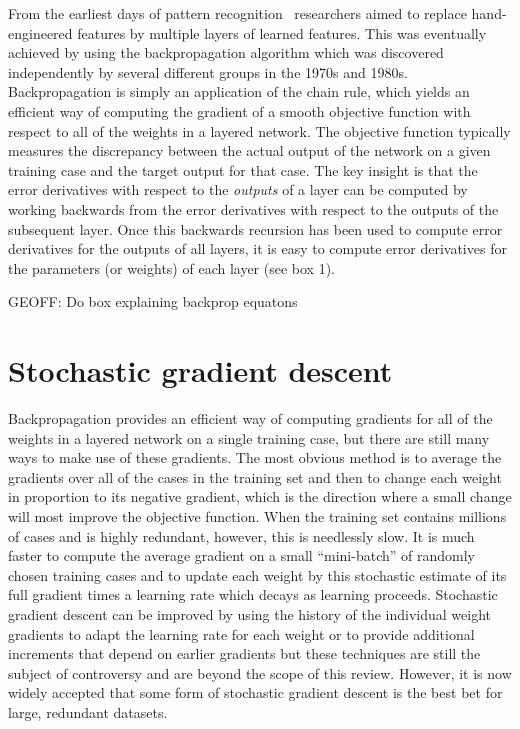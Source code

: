 \documentclass[]{article}
\begin{document}
From the earliest days of pattern recognition~\cite{selfridge, rosenblatt}
researchers aimed to replace hand-engineered features by multiple layers of
learned features.  This was eventually achieved by using the
backpropagation algorithm which was discovered independently by several
different groups in the 1970s and 1980s\cite{Werbos, Parker, Lecun,
  Rumelhart, schmidreference}.  Backpropagation is simply an application of
the chain rule, which yields an efficient way of computing the gradient of a
smooth objective function with respect to all of the weights in a layered
network. The objective function typically measures the discrepancy between
the actual output of the network on a given training case and the target
output for that case.  The key insight is that the error derivatives with
respect to the {\it outputs} of a layer can be computed by working
backwards from the error derivatives with respect to the outputs of the
subsequent layer. Once this backwards recursion has been used to compute
error derivatives for the outputs of all layers, it is easy to compute
error derivatives for the parameters (or weights) of each layer (see box
1).

GEOFF: Do box explaining backprop equatons

\section{Stochastic gradient descent}

Backpropagation provides an efficient way of computing gradients for all of
the weights in a layered network on a single training case, but there are
still many ways to make use of these gradients. The most obvious method is
to average the gradients over all of the cases in the training set and then
to change each weight in proportion to its negative gradient, which is the
direction where a small change will most improve the objective function. 
When the training set contains millions of cases and is highly redundant, however,
this is needlessly slow. It is much faster to compute the average gradient
on a small ``mini-batch'' of randomly chosen training cases and to update
each weight by this stochastic estimate of its full gradient times a
learning rate which decays as learning proceeds. Stochastic gradient
descent can be improved by using the history of the individual weight
gradients to adapt the learning rate for each weight\cite{bottou-bousquet}
or to provide additional increments that depend on earlier gradients\cite{momentum}
but these techniques are still the subject of controversy and are beyond
the scope of this review.  However, it is now widely accepted that some
form of stochastic gradient descent is the best bet for large, redundant
datasets.
\end{document}

